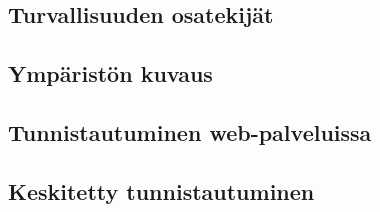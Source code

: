 
\subsection{Turvallisuuden osatekijät}

\subsection{Ympäristön kuvaus}

\subsection{Tunnistautuminen web-palveluissa}

\subsection{Keskitetty tunnistautuminen}

